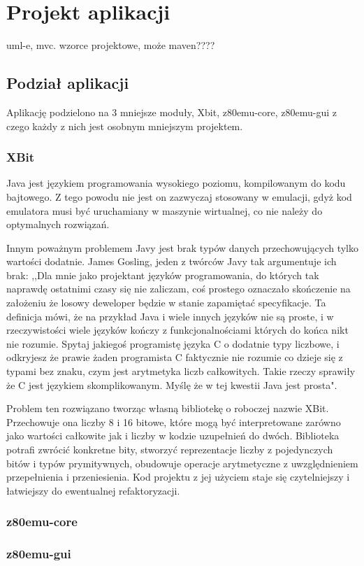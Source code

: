 \chapter{Projekt aplikacji}
	uml-e, mvc. wzorce projektowe, może maven????
	
	\section{Podział aplikacji}
	Aplikację podzielono na 3 mniejsze moduły, Xbit, z80emu-core, z80emu-gui z czego każdy z nich jest osobnym mniejszym projektem. 
	
	\subsection{XBit}
	Java jest językiem programowania wysokiego poziomu, kompilowanym do kodu bajtowego. Z tego powodu nie jest on zazwyczaj stosowany w emulacji, gdyż kod emulatora musi być uruchamiany w maszynie wirtualnej, co nie należy do optymalnych rozwiązań.
	
	Innym poważnym problemem Javy jest brak typów danych przechowujących tylko wartości dodatnie. James Gosling, jeden z twórców Javy tak argumentuje ich brak: 
	,,Dla mnie jako projektant języków programowania, do których tak naprawdę ostatnimi czasy się nie zaliczam, coś prostego oznaczało skończenie na założeniu że losowy deweloper będzie w stanie zapamiętać specyfikacje. 
	Ta definicja mówi, że na przykład Java i wiele innych języków nie są proste, i w rzeczywistości wiele języków kończy z funkcjonalnościami których do końca nikt nie rozumie. Spytaj jakiegoś programistę języka C o dodatnie typy liczbowe, i odkryjesz że prawie żaden programista C faktycznie nie rozumie co dzieje się z typami bez znaku, czym jest arytmetyka liczb całkowitych. Takie rzeczy sprawiły że C jest językiem skomplikowanym. Myślę że w tej kwestii Java jest prosta"\cite{javaGoslingInterview}.
	
	
	Problem ten rozwiązano tworząc własną bibliotekę o roboczej nazwie XBit. Przechowuje ona liczby 8 i 16 bitowe, które mogą być interpretowane zarówno jako wartości całkowite jak i liczby w kodzie uzupełnień do dwóch. Biblioteka potrafi zwrócić konkretne bity, stworzyć reprezentacje liczby z pojedynczych bitów i typów prymitywnych, obudowuje operacje arytmetyczne z uwzględnieniem przepełnienia i przeniesienia. Kod projektu z jej użyciem staje się czytelniejszy i łatwiejszy do ewentualnej refaktoryzacji. 
	
	\subsection{z80emu-core}
	
	\subsection{z80emu-gui}
	
	
	